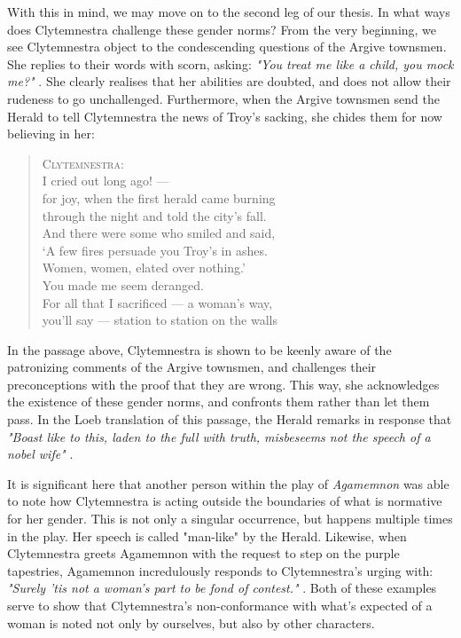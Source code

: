 With this in mind, we may move on to the second leg of our thesis. In what ways
does Clytemnestra challenge these gender norms? From the very beginning, we see
Clytemnestra object to the condescending questions of the Argive townsmen. She
replies to their words with scorn, asking: \emph{"You treat me like a child,
you mock me?"} \autocite[275]{fagles}. She clearly realises that her abilities
are doubted, and does not allow their rudeness to go unchallenged. Furthermore,
when the Argive townsmen send the Herald to tell Clytemnestra the news of Troy's
sacking, she chides them for now believing in her:

\begin{quote}
  \textsc{Clytemnestra}: \\
  I cried out long ago! --- \\
  for joy, when the first herald came burning \\
  through the night and told the city's fall. \\
  And there were some who smiled and said, \\
  `A few fires persuade you Troy's in ashes. \\
  Women, women, elated over nothing.' \\
  You made me seem deranged. \\
  For all that I sacrificed --- a woman's way, \\
  you'll say --- station to station on the walls

  \autocite[580]{fagles}
\end{quote}

\noindent
In the passage above, Clytemnestra is shown to be keenly aware of the
patronizing comments of the Argive townsmen, and challenges their preconceptions
with the proof that they are wrong. This way, she acknowledges the existence of
these gender norms, and confronts them rather than let them pass. In the Loeb
translation of this passage, the Herald remarks in response that \emph{"Boast
like to this, laden to the full with truth, misbeseems not the speech of a
nobel wife"} \autocite[613]{loeb}.

\noindent
It is significant here that another person within the play of \emph{Agamemnon}
was able to note how Clytemnestra is acting outside the boundaries of what is
normative for her gender. This is not only a singular occurrence, but happens
multiple times in the play. Her speech is called "man-like" by the Herald.
Likewise, when Clytemnestra greets Agamemnon with the request to step on the
purple tapestries, Agamemnon incredulously responds to Clytemnestra's urging
with: \emph{"Surely 'tis not a woman's part to be fond of contest."}
\autocite[940]{loeb}. Both of these examples serve to show that Clytemnestra's
non-conformance with what's expected of a woman is noted not only by ourselves,
but also by other characters.

